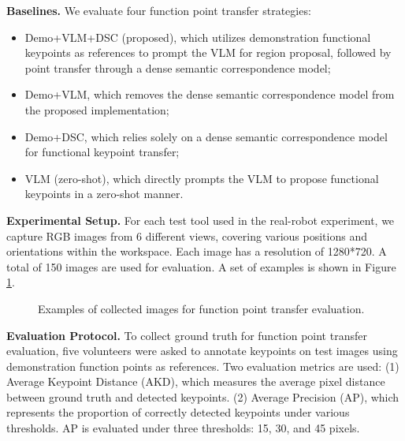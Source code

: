 \noindent \textbf{Baselines.} We evaluate four function point transfer strategies: 
\begin{itemize}
    \item Demo+VLM+DSC (proposed), which utilizes demonstration functional keypoints as references to prompt the VLM for region proposal, followed by point transfer through a dense semantic correspondence model;
    \item Demo+VLM, which removes the dense semantic correspondence model from the proposed implementation;
    \item Demo+DSC, which relies solely on a dense semantic correspondence model for functional keypoint transfer;
    \item VLM (zero-shot), which directly prompts the VLM to propose functional keypoints in a zero-shot manner. \\
\end{itemize}

\noindent \textbf{Experimental Setup.} For each test tool used in the real-robot experiment, we capture RGB images from 6 different views, covering various positions and orientations within the workspace. Each image has a resolution of 1280*720. A total of 150 images are used for evaluation. A set of examples is shown in Figure \ref{fig:keypoint_view}. 

\begin{figure}[h]
  \centering
    \vspace*{-0.2in}
  \caption{Examples of collected images for function point transfer evaluation.}
  \label{fig:keypoint_view}
\end{figure}


\noindent \textbf{Evaluation Protocol.} To collect ground truth for function point transfer evaluation,  five volunteers were asked to annotate keypoints on test images using demonstration function points as references. Two evaluation metrics are used: (1) Average Keypoint Distance (AKD), which measures the average pixel distance between ground truth and detected keypoints. (2) Average Precision (AP), which represents the proportion of correctly detected keypoints under various thresholds. AP is evaluated under three thresholds: 15, 30, and 45 pixels. \\

